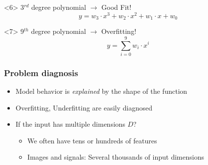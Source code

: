 \begin{frame}
\begin{onlyenv}
\begin{equation*}
    \end{equation*}
    \begin{center}
      \scalebox{0.5}{
        
      }
    \end{center}
  \end{onlyenv}
  \begin{onlyenv}<6>
    3$^{rd}$ degree polynomial \(\rightarrow\) Good Fit!
    \begin{equation*}
      y = w_3\cdot x^3 + w_2\cdot x^2 + w_1\cdot x + w_0
    \end{equation*}
    \begin{center}
      \scalebox{0.5}{
        
      }
    \end{center}
  \end{onlyenv}
  \begin{onlyenv}<7>
    9$^{th}$ degree polynomial \(\rightarrow\) Overfitting!
    \begin{equation*}
      y = \sum_{i=0}^{9}w_i\cdot x^{i}
    \end{equation*}
    \begin{center}
      \scalebox{0.5}{
        
      }
    \end{center}
  \end{onlyenv}
\end{frame}

\begin{frame}
  \frametitle{Problem diagnosis}

  \begin{itemize}
  \item Model behavior is \emph{explained} by the shape of the function
  \item Overfitting, Underfitting are easily diagnosed
  \item If the input has multiple dimensions $D$?
    \begin{itemize}
    \item We often have tens or hundreds of features
    \item Images and signals: Several thousands of input dimensions
    \end{itemize}
  \end{itemize}
\end{frame}



